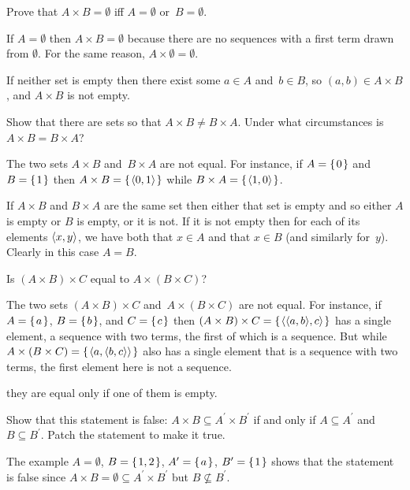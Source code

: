 \documentclass{ibl}  %
\begin{document}
\begin{problem} 
\begin{exes}
\begin{exercise} 
  Prove that $A\times B=\emptyset$ iff $A=\emptyset$ or~$B=\emptyset$.
\end{exercise}
\begin{answer}
  If $A=\emptyset$ then $A\times B=\emptyset$ because there are no 
  sequences with a first term drawn from $\emptyset$.
  For the same reason, $A\times\emptyset=\emptyset$.
 
  If neither set is empty then there exist some $a\in A$ and~$b\in B$, so 
  $(a,b)\in A\times B$, and $A\times B$ is not empty.  
\end{answer}
\begin{exercise} 
  Show that there are sets so that $A\times B\neq B\times A$.
  Under what circumstances is $A\times B=B\times A$?
\end{exercise}
\begin{answer}
  The two sets $A\times B$ and~$B\times A$ are not equal. 
  For instance, if $A=\mbox{$\{\hspace{0.1em}0\hspace{0.1em}\}$}$ and~$B=\mbox{$\{\hspace{0.1em}1\hspace{0.1em}\}$}$ then 
  $A\times B=\mbox{$\{\hspace{0.1em}\langle0,1\rangle\hspace{0.1em}\}$}$
  while
  $B\times A=\mbox{$\{\hspace{0.1em}\langle1,0\rangle\hspace{0.1em}\}$}$.

  If $A\times B$ and $B\times A$ are the same set then either that set is empty 
  and so either $A$ is empty or $B$ is empty,
  or it is not.
  If it is not empty then for each of its elements $\langle x,y\rangle$,
  we have both that $x\in A$ and that $x\in B$ (and similarly for~$y$).
  Clearly in this case $A=B$.  
\end{answer}
\begin{exercise} 
  Is $(A\times B)\times C$ equal to $A\times (B\times C)$?
\end{exercise}
\begin{answer}
  The two sets $(A\times B)\times C$ and~$A\times (B\times C)$ 
  are not equal.
  For instance, if $A=\mbox{$\{\hspace{0.1em}a\hspace{0.1em}\}$}$, $B=\mbox{$\{\hspace{0.1em}b\hspace{0.1em}\}$}$, and $C=\mbox{$\{\hspace{0.1em}c\hspace{0.1em}\}$}$ then 
  $(A\times B)\times C=\mbox{$\{\hspace{0.1em}\langle\langle a,b\rangle,c\rangle\hspace{0.1em}\}$}$
  has a single element, a sequence with two terms, the first
  of which is a sequence.
  But while $A\times(B\times C)=\mbox{$\{\hspace{0.1em}\langle a,\langle b,c\rangle\rangle\hspace{0.1em}\}$}$ 
  also has a single element that is a sequence with two terms, 
  the first element here is not a sequence. 

  \remark they are equal only if one of them is empty.  
\end{answer}
\begin{exercise} 
  Show that this statement is false: 
  $A\times B\subseteq A^\prime\times B^\prime$ if and only if
  $A\subseteq A^\prime$ and $B\subseteq B^\prime$.
  Patch the statement to make it true.
\end{exercise}
\begin{answer}
  The example 
  $A=\emptyset$, $B=\mbox{$\{\hspace{0.1em}1,2\hspace{0.1em}\}$}$, $A^\prime=\mbox{$\{\hspace{0.1em}a\hspace{0.1em}\}$}$, $B^\prime=\mbox{$\{\hspace{0.1em}1\hspace{0.1em}\}$}$
  shows that the statement is false since 
  $A\times B=\emptyset\subseteq A^\prime\times B^\prime$ but 
  $B\not\subseteq B^\prime$.


\end{answer}
\end{exes}
\end{problem}
\end{document}
